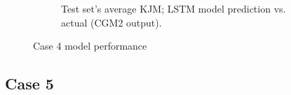 \documentclass[../main.tex]{subfiles}
\begin{document}
\begin{figure}[ht!]
\begin{subfigure}[b]{0.515\textwidth}
         \label{fig:case4-prediction-performance}
         \caption{Test set's average \ac{KJM}; LSTM model prediction vs. actual (CGM2 output).}
     \end{subfigure}
    \caption{Case 4 model performance}
    \label{fig:case4-performance-plots}
\end{figure}


\subsection{Case 5}
\label{sec:results-case5}
\end{document}
